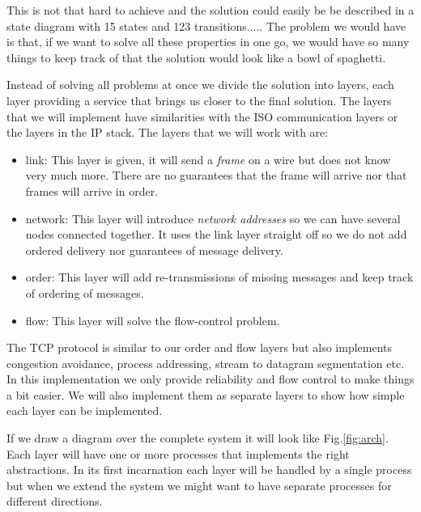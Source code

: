 \documentclass[a4paper,11pt]{article}
\begin{document}
This is not that hard to achieve and the solution could easily be be
described in a state diagram with 15 states and 123
transitions..... The problem we would have is that, if we want to solve
all these properties in one go, we would have so many things to keep
track of that the solution would look like a bowl of spaghetti.

Instead of solving all problems at once we divide the solution into
layers, each layer providing a service that brings us closer to the
final solution. The layers that we will implement have similarities
with the ISO communication layers or the layers in the IP stack. The
layers that we will work with are:

\begin{itemize}

\item link: This layer is given, it will send a {\em frame} on a
  wire but does not know very much more. There are no guarantees that the
  frame will arrive nor that frames will arrive in order.

\item network: This layer will introduce {\em network addresses} so we
  can have several nodes connected together. It uses the link layer
  straight off so we do not add ordered delivery nor guarantees of
  message delivery.

\item order: This layer will add re-transmissions of
  missing messages and keep track of ordering of messages. 
  
\item flow: This layer will solve the flow-control problem.

\end{itemize}

The TCP protocol is similar to our order and flow layers but also
implements congestion avoidance, process addressing, stream to datagram
segmentation etc. In this implementation we only provide reliability
and flow control to make things a bit easier. We will also implement
them as separate layers to show how simple each layer can be
implemented.

If we draw a diagram over the complete system it will look like
Fig.\ref{fig:arch}. Each layer will have one or more processes that
implements the right abstractions. In its first incarnation each layer
will be handled by a single process but when we extend the system we
might want to have separate processes for different directions.
\end{document}
